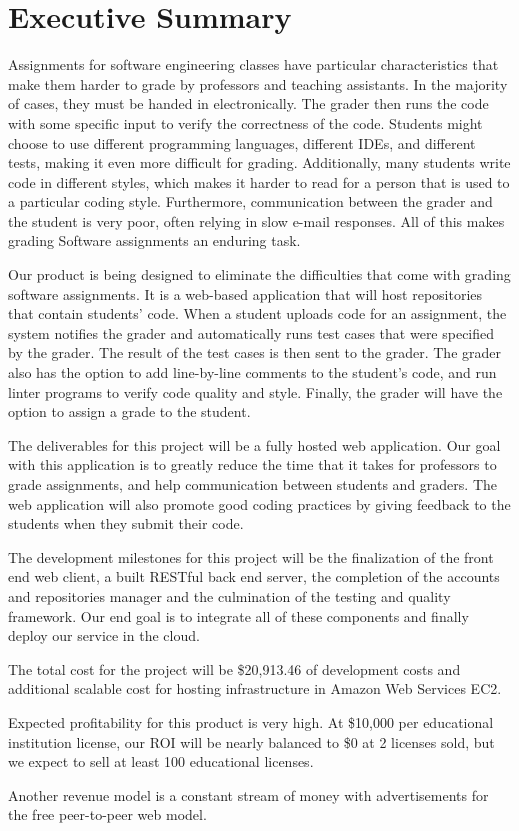 \part*{Executive Summary}

Assignments for software engineering classes have particular characteristics
that make them harder to grade by professors and teaching assistants. In the
majority of cases, they must be handed in electronically. The grader then runs
the code with some specific input to verify the correctness of the code.
Students might choose to use different programming languages, different IDEs,
and different tests, making it even more difficult for grading. Additionally,
many students write code in different styles, which makes it harder to read for
a person that is used to a particular coding style. Furthermore, communication
between the grader and the student is very poor, often relying in slow e-mail
responses.  All of this makes grading Software assignments an enduring task.

Our product is being designed to eliminate the difficulties that come with
grading software assignments. It is a web-based application that will
host repositories that contain students' code. When a student uploads code
for an assignment, the system notifies the grader and automatically runs test
cases that were specified by the grader. The result of the test cases is then
sent to the grader. The grader also has the option to add line-by-line comments
to the student's code, and run linter programs to verify code quality and
style. Finally, the grader will have the option to assign a grade to the
student.

The deliverables for this project will be a fully hosted web application. Our
goal with this application is to greatly reduce the time that it takes for
professors to grade assignments, and help communication between students and
graders. The web application will also promote good coding practices by giving
feedback to the students when they submit their code.

The development milestones for this project will be the finalization of the
front end web client, a built RESTful back end server, the completion of the
accounts and repositories manager and the culmination of the testing and quality
framework. Our end goal is to integrate all of these components and finally
deploy our service in the cloud.

The total cost for the project will be \$20,913.46 of development costs and
additional scalable cost for hosting infrastructure in Amazon Web Services EC2.

Expected profitability for this product is
very high. At \$10,000 per educational institution license, our ROI will be
nearly balanced to \$0 at 2 licenses sold, but we expect to sell at least 100
educational licenses.

Another revenue model is a constant stream of money with advertisements for the
free peer-to-peer web model.
